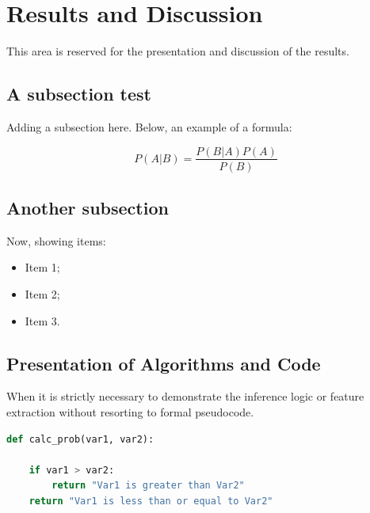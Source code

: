 \section{Results and Discussion}
This area is reserved for the presentation and discussion of the results.

\subsection{A subsection test}
Adding a subsection here. Below, an example of a formula:

\begin{equation}
P(A|B) = \frac{P(B|A)P(A)}{P(B)}
\label{eq:bayes}
\end{equation}

\subsection{Another subsection}
Now, showing items:

\begin{itemize}
    \item Item 1;
    \item Item 2;
    \item Item 3.
\end{itemize}

\subsection{Presentation of Algorithms and Code}
When it is strictly necessary to demonstrate the inference logic or feature extraction without resorting to formal pseudocode.

\begin{lstlisting}[language=Python, breaklines=true, basicstyle=\ttfamily\footnotesize]
def calc_prob(var1, var2):
    
    if var1 > var2:
        return "Var1 is greater than Var2"
    return "Var1 is less than or equal to Var2"
\end{lstlisting}
